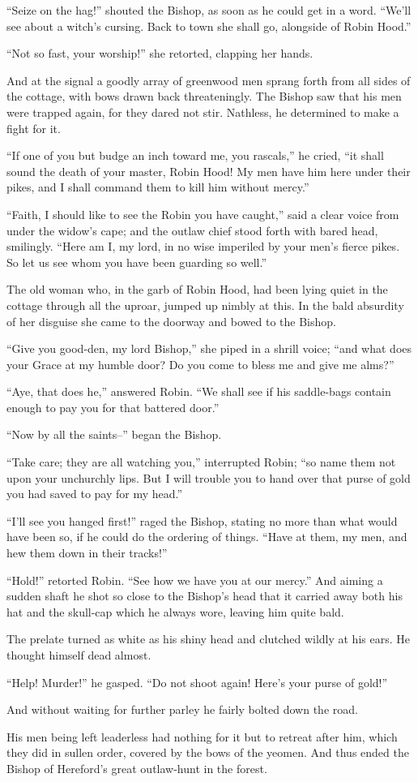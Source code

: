 ``Seize on the hag!'' shouted the Bishop, as soon as he could get in a
word. ``We'll see about a witch's cursing. Back to town she shall go,
alongside of Robin Hood.''

``Not so fast, your worship!'' she retorted, clapping her hands.

And at the signal a goodly array of greenwood men sprang forth from all
sides of the cottage, with bows drawn back threateningly. The Bishop saw
that his men were trapped again, for they dared not stir. Nathless, he
determined to make a fight for it.

``If one of you but budge an inch toward me, you rascals,'' he cried,
``it shall sound the death of your master, Robin Hood! My men have him
here under their pikes, and I shall command them to kill him without
mercy.''

``Faith, I should like to see the Robin you have caught,'' said a clear
voice from under the widow's cape; and the outlaw chief stood forth with
bared head, smilingly. ``Here am I, my lord, in no wise imperiled by
your men's fierce pikes. So let us see whom you have been guarding so
well.''

The old woman who, in the garb of Robin Hood, had been lying quiet in
the cottage through all the uproar, jumped up nimbly at this. In the
bald absurdity of her disguise she came to the doorway and bowed to the
Bishop.

``Give you good-den, my lord Bishop,'' she piped in a shrill voice;
``and what does your Grace at my humble door? Do you come to bless me
and give me alms?''

``Aye, that does he,'' answered Robin. ``We shall see if his saddle-bags
contain enough to pay you for that battered door.''

``Now by all the saints--'' began the Bishop.

``Take care; they are all watching you,'' interrupted Robin; ``so name
them not upon your unchurchly lips. But I will trouble you to hand over
that purse of gold you had saved to pay for my head.''

``I'll see you hanged first!'' raged the Bishop, stating no more than
what would have been so, if he could do the ordering of things. ``Have
at them, my men, and hew them down in their tracks!''

``Hold!'' retorted Robin. ``See how we have you at our mercy.'' And
aiming a sudden shaft he shot so close to the Bishop's head that it
carried away both his hat and the skull-cap which he always wore,
leaving him quite bald.

The prelate turned as white as his shiny head and clutched wildly at his
ears. He thought himself dead almost.

``Help! Murder!'' he gasped. ``Do not shoot again! Here's your purse of
gold!''

And without waiting for further parley he fairly bolted down the road.

His men being left leaderless had nothing for it but to retreat after
him, which they did in sullen order, covered by the bows of the yeomen.
And thus ended the Bishop of Hereford's great outlaw-hunt in the forest.
